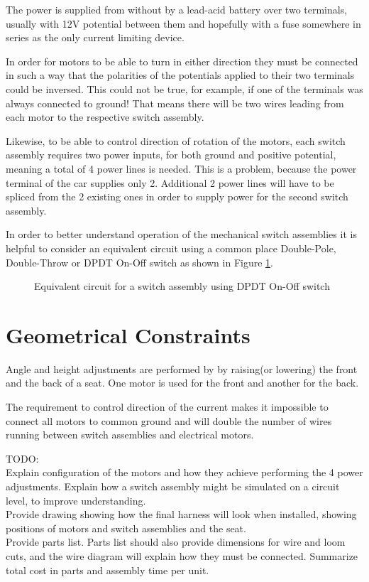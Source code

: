 \documentclass[12pt,letterpaper]{article}
\begin{document}
The power is supplied from without by a lead-acid battery over two terminals, usually with 12\si{\volt} potential between them and hopefully with a fuse somewhere in series as the only current limiting device. 

In order for motors to be able to turn in either direction they must be connected in such a way that the polarities of the potentials applied to their two terminals could be inversed. This could not be true, for example, if one of the terminals was always connected to ground! That means there will be two wires leading from each motor to the respective switch assembly.

Likewise, to be able to control direction of rotation of the motors, each switch assembly requires two power inputs, for both ground and positive potential, meaning a total of 4 power lines is needed. This is a problem, because the power terminal of the car supplies only 2. Additional 2 power lines will have to be spliced from the 2 existing ones in order to supply power for the second switch assembly.

In order to better understand operation of the mechanical switch assemblies it is helpful to consider an equivalent circuit using a common place Double-Pole, Double-Throw or DPDT On-Off switch as shown in Figure \ref{fig:motorcontrol}.
\vfill
\begin{figure}[h]\label{fig:motorcontrol}
\centering
\def\svgscale{0.6}

\caption{Equivalent circuit for a switch assembly using DPDT On-Off switch}
\end{figure}

\newpage

\section{Geometrical Constraints}

Angle and height adjustments are performed by by raising(or lowering) the front and the back of a seat. One motor is used for the front and another for the back.




The requirement to control direction of the current makes it impossible to connect all motors to common ground and will double the number of wires running between switch assemblies and electrical motors.

TODO:\\
Explain configuration of the motors and how they achieve performing the 4 power adjustments.
Explain how a switch assembly might be simulated on a circuit level, to improve understanding.\\
Provide drawing showing how the final harness will look when installed, showing positions of motors and switch assemblies and the seat.\\
Provide parts list. Parts list should also provide dimensions for wire and loom cuts, and the wire diagram will explain how they must be connected.
Summarize total cost in parts and assembly time per unit.
\end{document}
